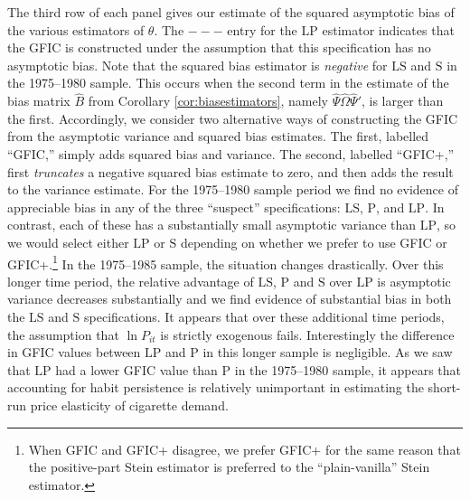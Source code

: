 The third row of each panel gives our estimate of the squared asymptotic bias of the various estimators of $\theta$.
The $---$ entry for the $\text{LP}$ estimator indicates that the GFIC is constructed under the assumption that this specification has no asymptotic bias.
Note that the squared bias estimator is \emph{negative} for $\text{LS}$ and $\text{S}$ in the 1975--1980 sample.
This occurs when the second term in the estimate of the bias matrix $\widehat{B}$ from Corollary \ref{cor:biasestimators}, namely $\widehat{\Psi}\widehat{\Omega}\widehat{\Psi}'$, is larger than the first.
Accordingly, we consider two alternative ways of constructing the GFIC from the asymptotic variance and squared bias estimates.
The first, labelled ``GFIC,'' simply adds squared bias and variance.
The second, labelled ``GFIC+,'' first \emph{truncates} a negative squared bias estimate to zero, and then adds the result to the variance estimate.
For the 1975--1980 sample period we find no evidence of appreciable bias in any of the three ``suspect'' specifications: $\text{LS}$, $\text{P}$, and $\text{LP}$.
In contrast, each of these has a substantially small asymptotic variance than $\text{LP}$, so we would select either $\text{LP}$ or $\text{S}$ depending on whether we prefer to use GFIC or GFIC+.\footnote{When GFIC and GFIC+ disagree, we prefer GFIC+ for the same reason that the positive-part Stein estimator is preferred to the ``plain-vanilla'' Stein estimator.}
In the 1975--1985 sample, the situation changes drastically.
Over this longer time period, the relative advantage of $\text{LS}$, $\text{P}$ and $\text{S}$ over $\text{LP}$ is asymptotic variance decreases substantially and we find evidence of substantial bias in both the $\text{LS}$ and $\text{S}$ specifications.
It appears that over these additional time periods, the assumption that $\ln P_{it}$ is strictly exogenous fails.
Interestingly the difference in GFIC values between $\text{LP}$ and $\text{P}$ in this longer sample is negligible.
As we saw that $\text{LP}$ had a lower GFIC value than $\text{P}$ in the 1975--1980 sample, it appears that accounting for habit persistence is relatively unimportant in estimating the short-run price elasticity of cigarette demand.

